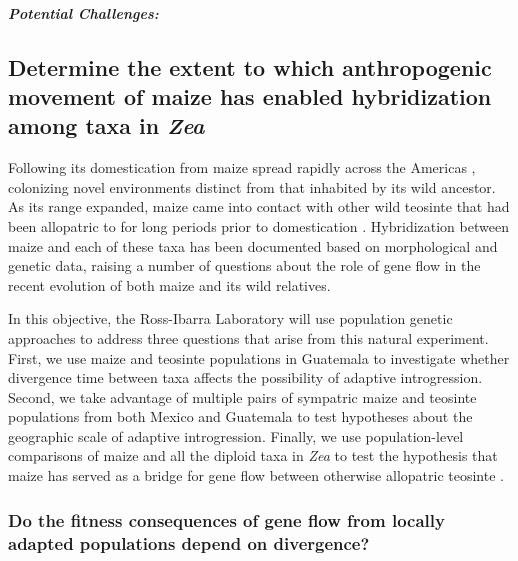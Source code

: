 \paragraph{\emph{Potential Challenges:}}

\subsection{Determine the extent to which anthropogenic movement of maize has enabled hybridization among taxa in \emph{Zea}} 
\label{ss:genuswide} 

Following its domestication from \zp{} maize spread rapidly across the Americas \citep{Piperno2001,Grobman2012}, colonizing novel environments distinct from that inhabited by its wild ancestor. 
As its range expanded, maize came into contact with other wild teosinte that had been allopatric to \zp{} for long periods prior to domestication \citep{hufford2012inferences}.  
Hybridization between maize and each of these taxa has been documented based on morphological \citep{wilkes1967teosinte, Wilkes1977} and genetic \citep{doebley1990molecular,Fukunaga2005,Ross-Ibarra2009a,vanheerwaarden2011a} data, raising a number of questions about the role of gene flow in the recent evolution of both maize and its wild relatives.

In this objective, the Ross-Ibarra Laboratory will use population genetic approaches to address three questions that arise from this natural experiment.  
First, we use maize and teosinte populations in Guatemala to investigate whether divergence time between taxa affects the possibility of adaptive introgression. 
Second, we take advantage of multiple pairs of sympatric maize and teosinte populations from both Mexico and Guatemala to test hypotheses about the geographic scale of adaptive introgression.
Finally, we use population-level comparisons of maize and all the diploid taxa in \emph{Zea} to test the hypothesis that maize has served as a bridge for gene flow between otherwise allopatric teosinte \citep{Ross-Ibarra2009a}.



\subsubsection{Do the fitness consequences of gene flow from locally adapted populations depend on divergence?}
\label{sss:adaptive_intro}

